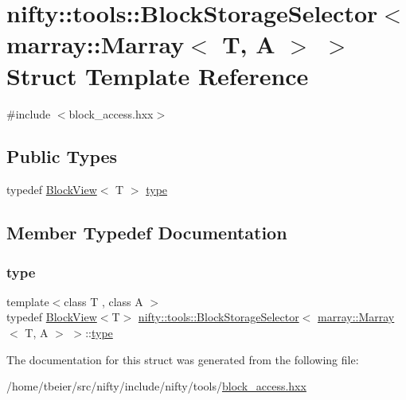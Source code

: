 \hypertarget{structnifty_1_1tools_1_1BlockStorageSelector_3_01marray_1_1Marray_3_01T_00_01A_01_4_01_4}{}\section{nifty\+:\+:tools\+:\+:Block\+Storage\+Selector$<$ marray\+:\+:Marray$<$ T, A $>$ $>$ Struct Template Reference}
\label{structnifty_1_1tools_1_1BlockStorageSelector_3_01marray_1_1Marray_3_01T_00_01A_01_4_01_4}


{\ttfamily \#include $<$block\+\_\+access.\+hxx$>$}

\subsection*{Public Types}
\begin{DoxyCompactItemize}
\item 
typedef \hyperlink{classnifty_1_1tools_1_1BlockView}{Block\+View}$<$ T $>$ \hyperlink{structnifty_1_1tools_1_1BlockStorageSelector_3_01marray_1_1Marray_3_01T_00_01A_01_4_01_4_a7f01429fe6373c157f12ee7c57b6f349}{type}
\end{DoxyCompactItemize}


\subsection{Member Typedef Documentation}
\mbox{\label{structnifty_1_1tools_1_1BlockStorageSelector_3_01marray_1_1Marray_3_01T_00_01A_01_4_01_4_a7f01429fe6373c157f12ee7c57b6f349}} 
\subsubsection{\texorpdfstring{type}{type}}
{\footnotesize\ttfamily template$<$class T , class A $>$ \\
typedef \hyperlink{classnifty_1_1tools_1_1BlockView}{Block\+View}$<$T$>$ \hyperlink{structnifty_1_1tools_1_1BlockStorageSelector}{nifty\+::tools\+::\+Block\+Storage\+Selector}$<$ \hyperlink{classandres_1_1Marray}{marray\+::\+Marray}$<$ T, A $>$ $>$\+::\hyperlink{structnifty_1_1tools_1_1BlockStorageSelector_3_01marray_1_1Marray_3_01T_00_01A_01_4_01_4_a7f01429fe6373c157f12ee7c57b6f349}{type}}



The documentation for this struct was generated from the following file\+:\begin{DoxyCompactItemize}
\item 
/home/tbeier/src/nifty/include/nifty/tools/\hyperlink{block__access_8hxx}{block\+\_\+access.\+hxx}\end{DoxyCompactItemize}
